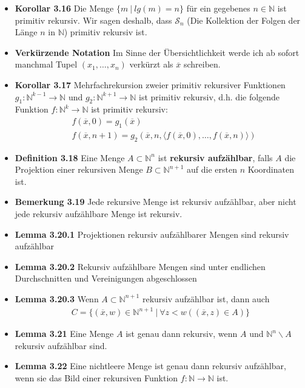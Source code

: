 \documentclass{scrartcl}
\newcommand{\goedel}[1]{\langle#1\rangle}
\begin{document}
\begin{itemize}
    \item{\textbf{Korollar 3.16}} Die Menge $\{m \ |\ lg(m) = n\}$ für ein gegebenes $n \in \mathbb{N}$ ist primitiv rekursiv. Wir sagen deshalb, dass $\mathcal{S}_n$ (Die Kollektion der Folgen der Länge $n$ in $\mathbb{N}$) primitiv rekursiv ist.
    
    \item{\textbf{Verkürzende Notation}} Im Sinne der Übersichtlichkeit werde ich ab sofort manchmal Tupel $(x_1, \hdots, x_n)$ verkürzt als $\overline{x}$ schreiben.
    
    \item{\textbf{Korollar 3.17}} Mehrfachrekursion zweier primitiv rekursiver Funktionen $g_1: \mathbb{N}^{k-1} \to \mathbb{N}$ und $g_2: \mathbb{N}^{k+1} \to \mathbb{N}$ ist primitiv rekursiv, d.h. die folgende Funktion $f: \mathbb{N}^k \to \mathbb{N}$ ist primitiv rekursiv:
    \begin{align*}
        &f(\overline{x},0) = g_1(\overline{x})\\
        &f(\overline{x},n+1) = g_2(\overline{x},n,\goedel{f(\overline{x},0), \hdots, f(\overline{x},n)})
    \end{align*}

    \item{\textbf{Definition 3.18}} Eine Menge $A \subset \mathbb{N}^n$ ist \textbf{rekursiv aufzählbar}, falls $A$ die Projektion einer rekursiven Menge $B \subset \mathbb{N}^{n+1}$ auf die ersten $n$ Koordinaten ist.
    \item{\textbf{Bemerkung 3.19}} Jede rekursive Menge ist rekursiv aufzählbar, aber nicht jede rekursiv aufzählbare Menge ist rekursiv.
    \item{\textbf{Lemma 3.20.1}} Projektionen rekursiv aufzählbarer Mengen sind rekursiv aufzählbar
    \item{\textbf{Lemma 3.20.2}} Rekursiv aufzählbare Mengen sind unter endlichen Durchschnitten und Vereinigungen abgeschlossen
    \item{\textbf{Lemma 3.20.3}} Wenn $A \subset \mathbb{N}^{n+1}$ rekursiv aufzählbar ist, dann auch
    \begin{align*}
        C = \{(\overline{x},w) \in \mathbb{N}^{n+1}\ |\ \forall z < w ((\overline{x},z) \in A)\}
    \end{align*}
    \item{\textbf{Lemma 3.21}}
    Eine Menge $A$ ist genau dann rekursiv, wenn $A$ und $\mathbb{N}^n\backslash A$ rekursiv aufzählbar sind.
    \item{\textbf{Lemma 3.22}} Eine nichtleere Menge ist genau dann rekursiv aufzählbar, wenn sie das Bild einer rekursiven Funktion $f: \mathbb{N} \to \mathbb{N}$ ist.
\end{itemize}
\end{document}
